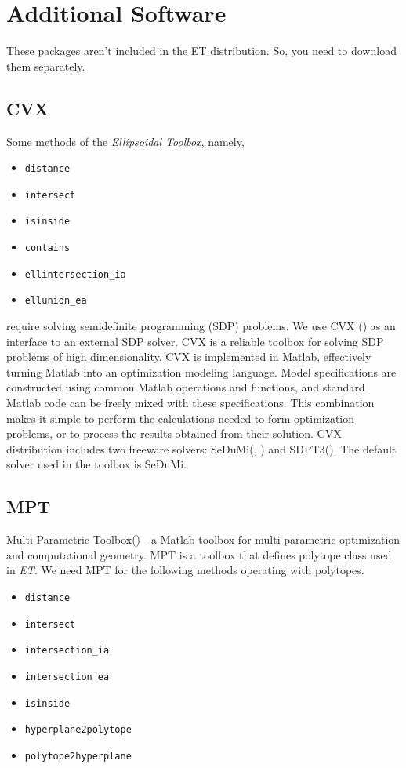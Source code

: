 \section{Additional Software}
These packages aren't included in the ET distribution.
So, you need to download them separately.
\subsection{CVX}
Some methods of the {\it Ellipsoidal Toolbox}, namely,
\begin{itemize}
\item {\tt distance}
\item {\tt intersect}
\item {\tt isinside}
\item {\tt contains}
\item {\tt ellintersection\_ia}
\item {\tt ellunion\_ea}
\end{itemize}
require solving semidefinite programming (SDP) problems.
We use CVX (\cite{CVX_HOMEPAGE}) as an
interface to an external SDP solver. CVX is a reliable toolbox
for solving SDP problems of high dimensionality.
CVX is implemented in Matlab, effectively turning Matlab into an
optimization modeling language. Model specifications are constructed
using common Matlab operations and functions, and standard
Matlab code can be freely mixed with these specifications.
This combination makes it simple to perform the calculations needed
to form optimization problems, or to process the results
obtained from their solution. CVX distribution includes two freeware
solvers: SeDuMi(\cite{STURM_USING_SEDUMI}, \cite{SEDUMI_HOMEPAGE})
and SDPT3(\cite{SDPT3_HOMEPAGE}). The default solver used in the toolbox is SeDuMi.

\subsection{MPT}
Multi-Parametric Toolbox(\cite{MULTI_PARAMETRIC_TOOLBOX_HOMEPAGE}) - a Matlab toolbox for multi-parametric
optimization and computational geometry. MPT is a toolbox
that defines polytope class
used in {\it ET}.
We need MPT for the following methods operating with polytopes.
\begin{itemize}
\item {\tt distance}
\item {\tt intersect}
\item {\tt intersection\_ia}
\item {\tt intersection\_ea}
\item {\tt isinside}
\item {\tt hyperplane2polytope}
\item {\tt polytope2hyperplane}
\end{itemize}


